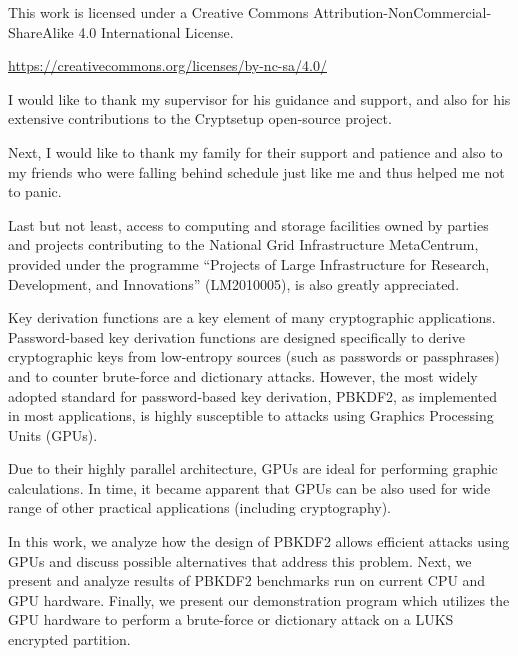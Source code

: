 \documentclass[12pt,oneside]{fithesis2}
\begin{document}
  \FrontMatter                    %
    \ThesisTitlePage                %
    
    This work is licensed under a Creative Commons Attribution-NonCommercial-ShareAlike 4.0 International License.
    \begin{center}
      \url{https://creativecommons.org/licenses/by-nc-sa/4.0/}
      \Large \ccbyncsa
    \end{center}
    
    \begin{ThesisDeclaration}       %
      \DeclarationText
      \AdvisorName
    \end{ThesisDeclaration}
    
    \begin{ThesisThanks}            %
      \sloppy
      I would like to thank my supervisor for his guidance and support, and also for his extensive contributions to the Cryptsetup open-source project.
      
      Next, I would like to thank my family for their support and patience and also to my friends who were falling behind schedule just like me and thus helped me not to panic.
      
      \sloppy
      Last but not least, access to computing and storage facilities owned by parties and projects contributing to the National Grid Infrastructure MetaCentrum, provided under the programme ``Projects of Large Infrastructure for Research, Development, and Innovations'' (LM2010005), is also greatly appreciated.
    \end{ThesisThanks}
    
    \begin{ThesisAbstract}          %
      Key derivation functions are a key element of many cryptographic applications. Password-based key derivation functions are designed specifically to derive cryptographic keys from low-entropy sources (such as passwords or passphrases) and to counter brute-force and dictionary attacks. However, the most widely adopted standard for password-based key derivation, PBKDF2, as implemented in most applications, is highly susceptible to attacks using Graphics Processing Units (GPUs).
      
      Due to their highly parallel architecture, GPUs are ideal for performing graphic calculations. In time, it became apparent that GPUs can be also used for wide range of other practical applications (including cryptography).
      
      In this work, we analyze how the design of PBKDF2 allows efficient attacks using GPUs and discuss possible alternatives that address this problem. Next, we present and analyze results of PBKDF2 benchmarks run on current CPU and GPU hardware. Finally, we present our demonstration program which utilizes the GPU hardware to perform a brute-force or dictionary attack on a LUKS encrypted partition.
    \end{ThesisAbstract}
    
\end{document}
